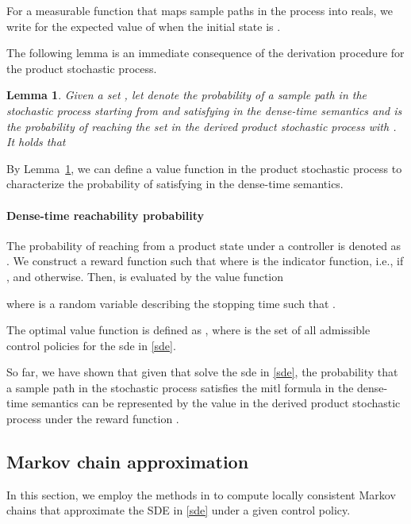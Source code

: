 \documentclass[letterpaper, 10 pt, conference]{ieeeconf}
\newtheorem{lemma}{Lemma}
\begin{document}
For a measurable function  that maps sample paths in the process
 into reals, we write  for the expected value of
 when the initial state is .


The following lemma is an immediate consequence of the derivation
procedure for the product stochastic process.
\begin{lemma}
\label{lma:relate}
  Given a set , let  denote
  the probability of a sample path in the stochastic process
   starting from  and satisfying 
  in the dense-time semantics and  is the probability of
  reaching the set  in the derived product stochastic process
   with . It holds that
  
\end{lemma}
By Lemma~\ref{lma:relate}, we can define a value function in the product
stochastic process to characterize the probability of satisfying
 in the dense-time semantics.
\paragraph*{\bf Dense-time reachability probability}
The probability of
reaching  from a product state  under a controller
 is denoted as .
We construct a reward function  such
that  where  is the indicator function, i.e.,
 if , and  otherwise.
Then,  is evaluated by the value function

where  is a random variable describing the stopping time such that
.  





The optimal value function is defined as
, where  is the set of all
admissible control policies for the \ac{sde} in \eqref{sde}.


So far, we have shown that given  that solve the
\ac{sde} in \eqref{sde}, the probability that a sample path in the
stochastic process  satisfies the \ac{mitl} formula
 in the dense-time semantics can be represented by the value
 in the derived product stochastic process  under
the reward function .

\subsection{Markov chain approximation}
In this section, we employ the methods in \cite{kushner2001numerical}
to compute locally consistent Markov chains that approximate the SDE
in \eqref{sde} under a given control policy.
\end{document}
